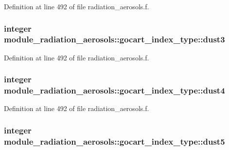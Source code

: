 Definition at line 492 of file radiation\+\_\+aerosols.\+f.

\subsubsection[{\texorpdfstring{dust3}{dust3}}]{\setlength{\rightskip}{0pt plus 5cm}integer module\+\_\+radiation\+\_\+aerosols\+::gocart\+\_\+index\+\_\+type\+::dust3\hspace{0.3cm}{\ttfamily [private]}}\hypertarget{group__module__radiation__aerosols_ga5d844db6dd6100b45808b5e19b468a84}{}\label{group__module__radiation__aerosols_ga5d844db6dd6100b45808b5e19b468a84}


Definition at line 492 of file radiation\+\_\+aerosols.\+f.

\subsubsection[{\texorpdfstring{dust4}{dust4}}]{\setlength{\rightskip}{0pt plus 5cm}integer module\+\_\+radiation\+\_\+aerosols\+::gocart\+\_\+index\+\_\+type\+::dust4\hspace{0.3cm}{\ttfamily [private]}}\hypertarget{group__module__radiation__aerosols_ga26a20aa03ac34523cc19644000d4924e}{}\label{group__module__radiation__aerosols_ga26a20aa03ac34523cc19644000d4924e}


Definition at line 492 of file radiation\+\_\+aerosols.\+f.

\subsubsection[{\texorpdfstring{dust5}{dust5}}]{\setlength{\rightskip}{0pt plus 5cm}integer module\+\_\+radiation\+\_\+aerosols\+::gocart\+\_\+index\+\_\+type\+::dust5\hspace{0.3cm}{\ttfamily [private]}}\hypertarget{group__module__radiation__aerosols_ga7d24acaa59ee8524dd8eca8f91f740c6}{}\label{group__module__radiation__aerosols_ga7d24acaa59ee8524dd8eca8f91f740c6}


